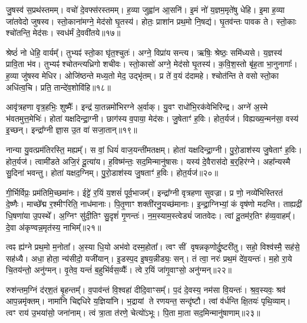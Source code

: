 जु॒षस्व॑ स॒प्रथ॑स्तमम्।
वचो॑ दे॒वफ्स॑रस्तमम्।
ह॒व्या जुह्वा॑न आ॒सनि॑।
इ॒मं नो॑ य॒ज्ञम॒मृते॑षु धेहि।
इ॒मा ह॒व्या जा॑तवेदो जुषस्व।
स्तो॒काना॑मग्ने॒ मेद॑सो घृ॒तस्य॑।
होतः॒ प्राशा॑न प्रथ॒मो नि॒षद्य॑।
घृ॒तव॑न्तः पावक ते।
स्तो॒काः श्चो॑तन्ति॒ मेद॑सः।
स्वध॑र्मं दे॒ववी॑तये॥१७॥

श्रेष्ठं॑ नो धेहि॒ वार्यम्᳚।
तुभ्यꣴ॑ स्तो॒का घृ॑त॒श्चुतः॑।
अग्ने॒ विप्रा॑य सन्त्य।
ऋषिः॒ श्रेष्ठः॒ समि॑ध्यसे।
य॒ज्ञस्य॑ प्रावि॒ता भ॑व।
तुभ्यꣴ॑ श्चोतन्त्यध्रिगो शचीवः।
स्तो॒कासो॑ अग्ने॒ मेद॑सो घृ॒तस्य॑।
क॒वि॒श॒स्तो बृ॑ह॒ता भा॒नुनागाः᳚।
ह॒व्या जु॑षस्व मेधिर।
ओजि॑ष्ठन्ते मध्य॒तो मेद॒ उद्भृ॑तम्।
प्र ते॑ व॒यं द॑दामहे।
श्चोत॑न्ति ते वसो स्तो॒का अधि॑त्व॒चि।
प्रति॒ तान्दे॑व॒शोवि॑हि॥१८॥\anuvakamend[दे॒ववी॑तय॒ उद्भृ॑त॒न्त्रीणि॑ च]

आवृ॑त्रहणा वृत्र॒हभिः॒ शुष्मैः᳚।
इन्द्र॑ या॒तन्नमो॑भिरग्ने अ॒र्वाक्।
यु॒वꣳ राधो॑भि॒रक॑वेभिरिन्द्र।
अग्ने॑ अ॒स्मे भ॑वतमुत्त॒मेभिः॑।
होता॑ यक्षदिन्द्रा॒ग्नी।
छाग॑स्य व॒पाया॒ मेद॑सः।
जु॒षेताꣳ॑ ह॒विः।
होत॒र्यज॑।
विह्यख्य॒न्मन॑सा॒ वस्य॑ इ॒च्छन्।
इन्द्रा᳚ग्नी ज्ञा॒स उ॒त वा॑ सजा॒तान्॥१९॥\phantom{वा॑}

नान्या यु॒वत्प्रम॑तिरस्ति॒ मह्यम्᳚।
स वां॒ धियं॑ वाज॒यन्ती॑मतक्षम्।
होता॑ यक्षदिन्द्रा॒ग्नी।
पु॒रो॒डाश॑स्य जु॒षेताꣳ॑ ह॒विः।
होत॒र्यज॑।
त्वामी॑डते अजि॒रं दू॒त्या॑य।
ह॒विष्म॑न्तः॒ सद॒मिन्मानु॑षासः।
यस्य॑ दे॒वैरास॑दो ब॒र्‌॒\mbox{}हिर॑ग्ने।
अहा᳚न्यस्मै सु॒दिना॑ भवन्तु।
होता॑ यक्षद॒ग्निम्।
पु॒रो॒डाश॑स्य जु॒षताꣳ॑ ह॒विः।
होत॒र्यज॑॥२०॥\anuvakamend[स॒जा॒तान॒ग्निन्द्वे च॑]

गी॒र्भिर्विप्रः॒ प्रम॑तिमि॒च्छमा॑नः।
ईट्टे॑ र॒यिं य॒शसं॑ पूर्व॒भाजम्᳚।
इन्द्रा᳚ग्नी वृत्रहणा सुवज्रा।
प्र णो॒ नव्ये॑भिस्तिरतं दे॒ष्णैः।
माच्छे᳚द्म र॒श्मीꣳरिति॒ नाध॑मानाः।
पि॒तृ॒णाꣳ शक्ती॑रनु॒\-यच्छ॑मानाः।
इ॒न्द्रा॒ग्निभ्यां॒ कं वृष॑णो मदन्ति।
ताह्यद्री॑ धि॒षणा॑या उ॒पस्थे᳚।
अ॒ग्निꣳ सु॑दी॒तिꣳ सु॒दृशं॑ गृ॒णन्तः॑।
न॒म॒स्याम॒स्त्वेड्यं॑ जातवेदः।
त्वां दू॒तम॑र॒तिꣳ ह॑व्य॒वाहम्᳚।
दे॒वा अ॑कृण्वन्न॒मृत॑स्य॒ नाभिम्᳚॥२१॥\anuvakamend[जा॒त॒वे॒दो॒ द्वे च॑]

त्वꣴ ह्य॑ग्ने प्रथ॒मो म॒नोता᳚।
अ॒स्या धि॒यो अभ॑वो दस्म॒होता᳚।
त्वꣳ सीं वृषन्नकृणोर्दु॒ष्टरी॑तु।
सहो॒ विश्व॑स्मै॒ सह॑से॒ सह॑ध्यै।
अधा॒ होता॒ न्य॑सीदो॒ यजी॑यान्।
इ॒डस्प॒द इ॒षय॒न्नीड्यः॒ सन्।
तं त्वा॒ नरः॑ प्रथ॒मं दे॑व॒यन्तः॑।
म॒हो रा॒ये चि॒तय॑न्तो॒ अनु॑ग्मन्।
वृ॒तेव॒ यन्तं॑ ब॒हुभि॑र्वस॒व्यैः᳚।
त्वे र॒यिं जा॑गृ॒वाꣳसो॒ अनु॑ग्मन्॥२२॥

रुश॑न्तम॒ग्निं द॑र्‌\mbox{}श॒तं बृ॒हन्तम्᳚।
व॒पाव॑न्तं वि॒श्वहा॑ दीदि॒वाꣳसम्᳚।
प॒दं दे॒वस्य॒ नम॑सा वि॒यन्तः॑।
श्र॒व॒स्यवः॒ श्रव॑ आप॒न्नमृ॑क्तम्।
नामा॑नि चिद्दधिरे य॒ज्ञिया॑नि।
भ॒द्रायां ते रणयन्त॒ सन्दृ॑ष्टौ।
त्वां व॑र्धन्ति क्षि॒तयः॑ पृथि॒व्याम्।
त्वꣳ राय॑ उ॒भया॑सो॒ जना॑नाम्।
त्वं त्रा॒ता त॑रणे॒ चेत्यो॑ऽभूः।
पि॒ता मा॒ता सद॒मिन्मानु॑षाणाम्॥२३॥


